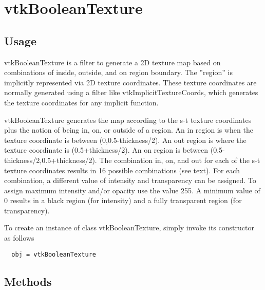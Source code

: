 \section{vtkBooleanTexture}

\subsection{Usage}

 vtkBooleanTexture is a filter to generate a 2D texture map based on 
 combinations of inside, outside, and on region boundary. The ''region'' is
 implicitly represented via 2D texture coordinates. These texture 
 coordinates are normally generated using a filter like 
 vtkImplicitTextureCoords, which generates the texture coordinates for 
 any implicit function.

 vtkBooleanTexture generates the map according to the s-t texture
 coordinates plus the notion of being in, on, or outside of a
 region. An in region is when the texture coordinate is between
 (0,0.5-thickness/2).  An out region is where the texture coordinate
 is (0.5+thickness/2). An on region is between
 (0.5-thickness/2,0.5+thickness/2). The combination in, on, and out
 for each of the s-t texture coordinates results in 16 possible
 combinations (see text). For each combination, a different value of 
 intensity and transparency can be assigned. To assign maximum intensity
 and/or opacity use the value 255. A minimum value of 0 results in
 a black region (for intensity) and a fully transparent region (for
 transparency).

To create an instance of class vtkBooleanTexture, simply
invoke its constructor as follows
\begin{verbatim}
  obj = vtkBooleanTexture
\end{verbatim}
\subsection{Methods}

